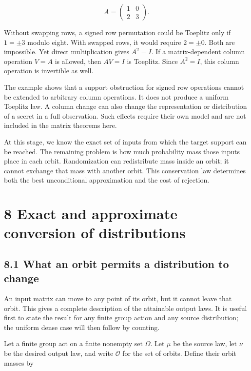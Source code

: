 \documentclass[
]{article}
\begin{document}
\[
A=\begin{pmatrix}1&0\\2&3\end{pmatrix}.
\]

Without swapping rows, a signed row permutation could be Toeplitz only
if \(1=\pm3\) modulo eight. With swapped rows, it would require
\(2=\pm0\). Both are impossible. Yet direct multiplication gives
\(A^2=I\). If a matrix-dependent column operation \(V=A\) is allowed,
then \(AV=I\) is Toeplitz. Since \(A^2=I\), this column operation is
invertible as well.

The example shows that a support obstruction for signed row operations
cannot be extended to arbitrary column operations. It does not produce a
uniform Toeplitz law. A column change can also change the representation
or distribution of a secret in a full observation. Such effects require
their own model and are not included in the matrix theorems here.

At this stage, we know the exact set of inputs from which the target
support can be reached. The remaining problem is how much probability
mass those inputs place in each orbit. Randomization can redistribute
mass inside an orbit; it cannot exchange that mass with another orbit.
This conservation law determines both the best unconditional
approximation and the cost of rejection.

\section{8 Exact and approximate conversion of
distributions}\label{exact-and-approximate-conversion-of-distributions}

\subsection{8.1 What an orbit permits a distribution to
change}\label{what-an-orbit-permits-a-distribution-to-change}

An input matrix can move to any point of its orbit, but it cannot leave
that orbit. This gives a complete description of the attainable output
laws. It is useful first to state the result for any finite group action
and any source distribution; the uniform dense case will then follow by
counting.

Let a finite group act on a finite nonempty set \(\Omega\). Let \(\mu\)
be the source law, let \(\nu\) be the desired output law, and write
\(\mathscr O\) for the set of orbits. Define their orbit masses by
\end{document}
